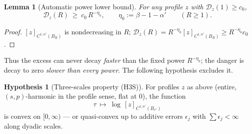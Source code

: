 \documentclass[11pt]{amsart}
\theoremstyle{plain}
\newtheorem{lemma}[theorem]{Lemma}
\theoremstyle{definition}
\newtheorem{hypothesis}[theorem]{Hypothesis}
\theoremstyle{remark}
\newcommand{\al}{\alpha}
\begin{document}
\begin{lemma}[Automatic power lower bound]\label{lem:autopower}
For any profile $z$ with $\mathcal D_z(1)\ge c_0$,
\[
  \mathcal D_z(R)\ \ge\ c_0\,R^{-\eta_0},
  \qquad \eta_0:=\beta-1-\al'\qquad(R\ge1).
\]
\end{lemma}
\begin{proof}
$[z]_{C^{1,\al'}(B_R)}$ is nondecreasing in $R$;
$\mathcal D_z(R)=R^{-\eta_0}[z]_{C^{1,\al'}(B_R)}\ge R^{-\eta_0}c_0$.
\end{proof}

\noindent Thus the excess can never decay \emph{faster} than the fixed
power $R^{-\eta_0}$; the danger is decay to zero \emph{slower than every
power}. The following hypothesis excludes it.

\begin{hypothesis}[Three-scales property \textnormal{(H3S)}]\label{hyp:H3S}
For profiles $z$ as above \textnormal{(}entire, $(s,p)$-harmonic in the
profile sense, flat at $0$\textnormal{)}, the function
\[
  \tau\ \longmapsto\ \log\,[z]_{C^{1,\al'}(B_{e^\tau})}
\]
is convex on $[0,\infty)$ --- or quasi-convex up to additive errors
$\epsilon_j$ with $\sum\epsilon_j<\infty$ along dyadic scales.
\end{hypothesis}
\end{document}
